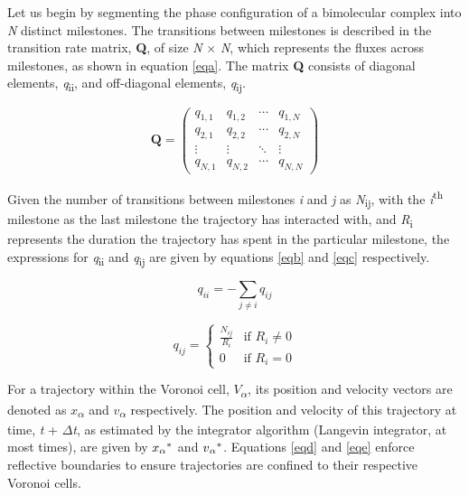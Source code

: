 \documentclass[9pt,training,pubversion]{livecoms}
\begin{document}
\noindent Let us begin by segmenting the phase configuration of a bimolecular complex into \textit{N} distinct milestones. The transitions between milestones is described in the transition rate matrix, \textbf{Q}, of size \textit{N} $\times$ \textit{N}, which represents the fluxes across milestones, as shown in equation \ref{eqa}. The matrix \textbf{Q} consists of diagonal elements, \textit{q}\textsubscript{ii}, and off-diagonal elements, \textit{q}\textsubscript{ij}. 

\begin{equation}
\textbf{Q} = \begin{pmatrix}
q_{1,1} & q_{1,2} & \cdots & q_{1,N} \\
q_{2,1} & q_{2,2} & \cdots & q_{2,N} \\
\vdots  & \vdots  & \ddots & \vdots  \\
q_{N,1} & q_{N,2} & \cdots & q_{N,N}
\end{pmatrix}
\label{eqa}
\end{equation}


\noindent Given the number of transitions between milestones \textit{i} and \textit{j} as \textit{N}\textsubscript{ij}, with the \textit{i}\textsuperscript{th} milestone as the last milestone the trajectory has interacted with, and \textit{R}\textsubscript{i} represents the duration the trajectory has spent in the particular milestone, the expressions for \textit{q}\textsubscript{ii} and \textit{q}\textsubscript{ij} are given by equations \ref{eqb} and \ref{eqc} respectively.

\begin{equation}
q_{ii} = - \sum_{j \neq i} q_{ij}
\label{eqb}
\end{equation}

\begin{equation}
q_{ij} =
\begin{cases}
\frac{N_{ij}}{R_i} & \text{if $R_i \neq 0$} \\
0 & \text{if $R_i = 0$}
\end{cases}
\label{eqc}
\end{equation}

\noindent For a trajectory within the Voronoi cell, $V$\textsubscript{$\alpha$}, its position and velocity vectors are denoted as $x$\textsubscript{$\alpha$} and $v$\textsubscript{$\alpha$} respectively. The position and velocity of this trajectory at time, \textit{t} + $\Delta$\textit{t}, as estimated by the integrator algorithm (Langevin integrator, at most times), are given by $x\textsubscript{$\alpha$}^{*}$ and $v\textsubscript{$\alpha$}^{*}$. Equations \ref{eqd} and \ref{eqe} enforce reflective boundaries to ensure trajectories are confined to their respective Voronoi cells.
\end{document}
